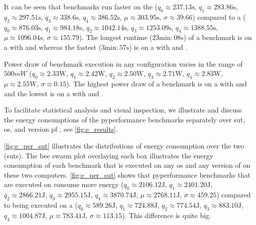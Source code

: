 It can be seen that benchmarks run faster on the 
($q_{0} \approx 237.13\unit{\second}$,
$q_{1} \approx 283.86\unit{\second}$,
$q_{2} \approx 297.51\unit{\second}$,
$q_{3} \approx 338.6\unit{\second}$,
$q_{4} \approx 386.52\unit{\second}$,
$\mu \approx 303.95\unit{\second}$,
$\sigma \approx39.66$)
compared to a 
($q_{0} \approx 876.03\unit{\second}$,
$q_{1} \approx 984.18\unit{\second}$,
$q_{2} \approx 1042.14\unit{\second}$,
$q_{3} \approx 1253.09\unit{\second}$,
$q_{4} \approx 1388.55\unit{\second}$,
$\mu \approx 1096.04\unit{\second}$,
$\sigma \approx 155.79$).
The longest runtime ($23\unit{\minute}:08\unit{\second}$) of a benchmark is on a  with  and  whereas the fastest ($3\unit{\minute}:57\unit{\second}$) is on a  with  and .

Power draw of benchmark execution in any configuration varies in the range of $500mW$
($q_{0} \approx 2.33\unit{\watt}$,
$q_{1} \approx 2.42\unit{\watt}$,
$q_{2} \approx 2.50\unit{\watt}$,
$q_{3} \approx 2.71\unit{\watt}$,
$q_{4} \approx 2.83\unit{\watt}$,
$\mu \approx 2.55\unit{\watt}$,
$\sigma \approx 0.15$).
The highest power draw of a benchmark is on a  with  and  and the lowest is on a  with  and .

To facilitate statistical analysis and visual inspection, we illustrate and discuss the energy consumptions of the \gls{pyperformance} benchmarks separately over \gls{sut}, \gls{os}, and version pf \python, see \autoref{fig:e_results}.

\autoref{fig:e_per_sut} illustrates the distributions of energy consumption over the two  (\glspl{sut}).
The bee swarm plot overlaying each box illustrates the energy consumption of each benchmark that is executed on any \gls{os} and any version of \python on these two computers.
\autoref{fig:e_per_sut} shows that \gls{pyperformance} benchmarks that are executed on  consume more energy
($q_{0} \approx 2106.12\unit{\joule}$,
$q_{1} \approx 2401.20\unit{\joule}$,
$q_{2} \approx 2866.21\unit{\joule}$,
$q_{3} \approx 2955.15\unit{\joule}$,
$q_{4} \approx 3870.74\unit{\joule}$,
$\mu \approx 2768.11\unit{\joule}$,
$\sigma \approx459.25$)
compared to being executed on a 
($q_{0} \approx  589.26\unit{\joule}$,
$q_{1} \approx  724.88\unit{\joule}$,
$q_{2} \approx  774.54\unit{\joule}$,
$q_{3} \approx  883.10\unit{\joule}$,
$q_{4} \approx 1004.87\unit{\joule}$,
$\mu \approx 783.41\unit{\joule}$,
$\sigma \approx113.15$).
This difference is quite big.

